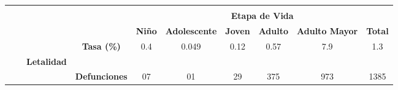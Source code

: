 	\begin{tabular}{lccc|cccccc|}
		\cline{5-10}
		&
		\multicolumn{1}{l}{} &
		&
		&
		\multicolumn{6}{c|}{\cellcolor[HTML]{F2F2F2}} \\
		&
		\multicolumn{1}{l}{} &
		\multicolumn{1}{l}{} &
		\multicolumn{1}{l|}{} &
		\multicolumn{6}{c|}{\multirow{-2}{*}{\cellcolor[HTML]{F2F2F2}\textbf{Etapa de Vida}}} \\ \cline{5-10} 
		&
		\multicolumn{1}{l}{} &
		\multicolumn{1}{l}{} &
		\multicolumn{1}{l|}{} &
		\multicolumn{1}{c|}{\cellcolor[HTML]{F2F2F2}\textbf{Niño}} &
		\multicolumn{1}{l|}{\cellcolor[HTML]{F2F2F2}\textbf{Adolescente}} &
		\multicolumn{1}{l|}{\cellcolor[HTML]{F2F2F2}\textbf{Joven}} &
		\multicolumn{1}{l|}{\cellcolor[HTML]{F2F2F2}\textbf{Adulto}} &
		\multicolumn{1}{l|}{\cellcolor[HTML]{F2F2F2}\textbf{Adulto Mayor}} &
		\cellcolor[HTML]{F2F2F2}\textbf{Total} \\ \cline{2-10} 
		\multicolumn{1}{l|}{} &
		\multicolumn{1}{c|}{\cellcolor[HTML]{ECF4FF}} &
		\multicolumn{1}{c|}{\cellcolor[HTML]{ECF4FF}} &
		\cellcolor[HTML]{ECF4FF}\textbf{Tasa (\%)} &
		\multicolumn{1}{c|}{\cellcolor[HTML]{ECF4FF}0.4} &
		\multicolumn{1}{c|}{\cellcolor[HTML]{ECF4FF}0.049} &
		\multicolumn{1}{c|}{\cellcolor[HTML]{ECF4FF}0.12} &
		\multicolumn{1}{c|}{\cellcolor[HTML]{ECF4FF}0.57} &
		\multicolumn{1}{c|}{\cellcolor[HTML]{ECF4FF}7.9} &
		\cellcolor[HTML]{ECF4FF}1.3 \\ \cline{4-10} 
		\multicolumn{1}{l|}{} &
		\multicolumn{1}{c|}{\cellcolor[HTML]{ECF4FF}} &
		\multicolumn{1}{c|}{\multirow{-2}{*}{\cellcolor[HTML]{ECF4FF}\textbf{Letalidad}}} &
		\cellcolor[HTML]{ECF4FF} &
		\multicolumn{1}{c|}{\cellcolor[HTML]{ECF4FF}} &
		\multicolumn{1}{c|}{\cellcolor[HTML]{ECF4FF}} &
		\multicolumn{1}{c|}{\cellcolor[HTML]{ECF4FF}} &
		\multicolumn{1}{c|}{\cellcolor[HTML]{ECF4FF}} &
		\multicolumn{1}{c|}{\cellcolor[HTML]{ECF4FF}} &
		\cellcolor[HTML]{ECF4FF} \\ \cline{3-3}
		\multicolumn{1}{l|}{} &
		\multicolumn{1}{c|}{\cellcolor[HTML]{ECF4FF}} &
		\multicolumn{1}{c|}{\cellcolor[HTML]{ECF4FF}} &
		\multirow{-2}{*}{\cellcolor[HTML]{ECF4FF}\textbf{Defunciones}} &
		\multicolumn{1}{c|}{\multirow{-2}{*}{\cellcolor[HTML]{ECF4FF}07}} &
		\multicolumn{1}{c|}{\multirow{-2}{*}{\cellcolor[HTML]{ECF4FF}01}} &
		\multicolumn{1}{c|}{\multirow{-2}{*}{\cellcolor[HTML]{ECF4FF}29}} &
		\multicolumn{1}{c|}{\multirow{-2}{*}{\cellcolor[HTML]{ECF4FF}375}} &
		\multicolumn{1}{c|}{\multirow{-2}{*}{\cellcolor[HTML]{ECF4FF}973}} &
		\multirow{-2}{*}{\cellcolor[HTML]{ECF4FF}1385} \\ \cline{4-10} 

\end{tabular}
